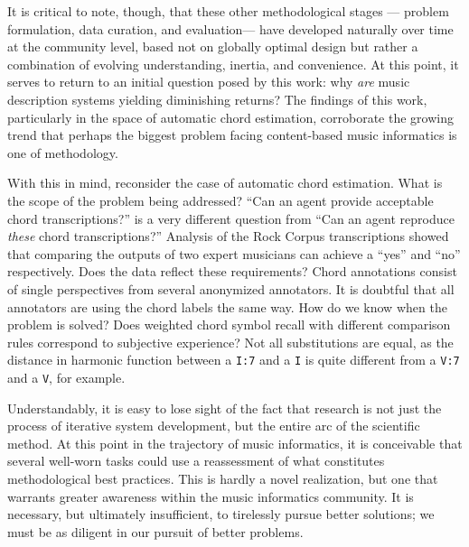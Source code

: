 It is critical to note, though, that these other methodological stages --- problem formulation, data curation, and evaluation--- have developed naturally over time at the community level, based not on globally optimal design but rather a combination of evolving understanding, inertia, and convenience.
At this point, it serves to return to an initial question posed by this work:
why \emph{are} music description systems yielding diminishing returns?
The findings of this work, particularly in the space of automatic chord estimation, corroborate the growing trend that perhaps the biggest problem facing content-based music informatics is one of methodology.

With this in mind, reconsider the case of automatic chord estimation.
What is the scope of the problem being addressed?
``Can an agent provide acceptable chord transcriptions?'' is a very different question from ``Can an agent reproduce \emph{these} chord transcriptions?''
Analysis of the Rock Corpus transcriptions showed that comparing the outputs of two expert musicians can achieve a ``yes'' and ``no'' respectively.
Does the data reflect these requirements?
Chord annotations consist of single perspectives from several anonymized annotators.
It is doubtful that all annotators are using the chord labels the same way.
How do we know when the problem is solved?
Does weighted chord symbol recall with different comparison rules correspond to subjective experience?
Not all substitutions are equal, as the distance in harmonic function between a \texttt{I:7} and a \texttt{I} is quite different from a \texttt{V:7} and a \texttt{V}, for example.

Understandably, it is easy to lose sight of the fact that research is not just the process of iterative system development, but the entire arc of the scientific method.
At this point in the trajectory of music informatics, it is conceivable that several well-worn tasks could use a reassessment of what constitutes methodological best practices.
This is hardly a novel realization, but one that warrants greater awareness within the music informatics community.
It is necessary, but ultimately insufficient, to tirelessly pursue better solutions;
we must be as diligent in our pursuit of better problems.
